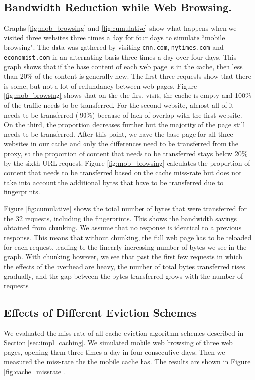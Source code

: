 \subsection{Bandwidth Reduction while Web Browsing.}
Graphs \ref{fig:mob_browsing} and \ref{fig:cumulative} show what happens when we visited three websites three times a day for four days to simulate ``mobile browsing". 
The data was gathered by visiting \texttt{cnn.com}, \texttt{nytimes.com} and \texttt{economist.com} in an alternating basis three times a day over four days. This graph shows that if the base content of each web page is in the cache, then less than 20\% of the content is generally new. The first three requests show that there is some, but not a lot of redundancy between web pages.
Figure \ref{fig:mob_browsing} shows that on the the first visit, the cache is empty and 100\% of the traffic needs to be transferred. 
For the second website, almost all of it needs to be transferred ($~$90\%) because of lack of overlap with the first website. 
On the third, the proportion decreases further but the majority of the page still needs to be transferred. 
After this point, we have the base page for all three websites in our cache and only the differences need to be transferred from the proxy, so the proportion of content that needs to be transferred stays below 20\% by the sixth URL request. 
Figure \ref{fig:mob_browsing} calculates the proportion of content that needs to be transferred based on the cache miss-rate but does not take into account the additional bytes that have to be transferred due to fingerprints.

Figure \ref{fig:cumulative} shows the total number of bytes that were transferred for the 32 requests, including the fingerprints. This shows the bandwidth savings obtained from chunking.
We assume that no response is identical to a previous response. 
This means that without chunking, the full web page has to be reloaded for each request, leading to the linearly increasing number of bytes we see in the graph. 
With chunking however, we see that past the first few requests in which the effects of the overhead are heavy, the number of total bytes transferred rises gradually, and the gap between the bytes transferred grows with the number of requests.

\subsection{Effects of Different Eviction Schemes}
We evaluated the miss-rate of  all cache eviction algorithm schemes described in Section \ref{sec:impl_caching}. We simulated mobile web browsing of three web pages, opening them three times a day in four consecutive days. Then we
measured the miss-rate the the mobile cache has. The results are shown in Figure \ref{fig:cache_missrate}.

